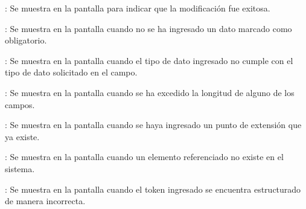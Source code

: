 \begin{Citemize}
	\item {}: Se muestra en la pantalla  para indicar que la modificación fue exitosa.
	\item {}: Se muestra en la pantalla  cuando no se ha ingresado un dato marcado como obligatorio.
	\item {}: Se muestra en la pantalla  cuando el tipo de dato ingresado no cumple con el tipo de dato solicitado en el campo.
	\item {}: Se muestra en la pantalla  cuando se ha excedido la longitud de alguno de los campos.
	\item {}: Se muestra en la pantalla  cuando se haya ingresado un punto de extensión que ya existe.
	\item {}: Se muestra en la pantalla  cuando un elemento referenciado no existe en el sistema.
	\item {}: Se muestra en la pantalla  cuando el token ingresado se encuentra estructurado de manera incorrecta.
\end{Citemize}
